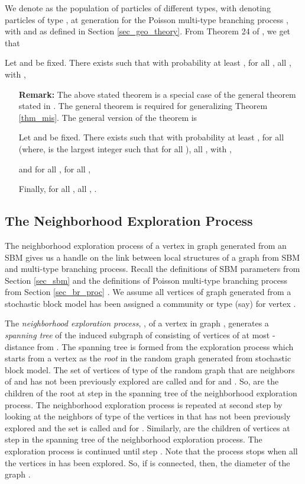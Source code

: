\documentclass[graybox]{svmult}
\begin{document}
We denote  as the population of particles of  different types, with  denoting particles of type , at generation  for the Poisson multi-type branching process , with  and  as defined in Section \ref{sec_geo_theory}. From Theorem 24 of \cite{bordenave2015non}, we get that 
\begin{theorem}
\label{thm_bp1}
Let  and  be fixed. There exists  such that with probability at least , for all , all , with , 

\end{theorem}
\begin{itemize}
\item[\textbf{Remark:}] \hspace{0.4in}The above stated theorem is a special case of the general theorem stated in \cite{bordenave2015non}. The general theorem is required for generalizing Theorem \ref{thm_mis}. The general version of the theorem is
\begin{theorem}
\label{thm_bp2}
Let  and  be fixed. There exists  such that with probability at least , for all  (where,  is the largest integer such that  for all ), all , with , 

and for all , for all , 

Finally, for all , all , .
\end{theorem}
\end{itemize}



\subsection{The Neighborhood Exploration Process}
\label{sec_nbhd_exp}
The neighborhood exploration process of a vertex  in graph  generated from an SBM gives us a handle on the link between local structures of a graph from SBM and multi-type branching process. Recall the definitions of SBM parameters from Section \ref{sec_sbm} and the definitions of Poisson multi-type branching process from Section \ref{sec_br_proc} . We assume all vertices of graph  generated from a stochastic block model has been assigned a community or type  (say) for vertex . 


The \textit{neighborhood exploration process}, , of a vertex  in graph , generates a \emph{spanning tree} of the induced subgraph of  consisting of vertices of at most -distance from . 
The spanning tree is formed from the exploration process which starts from a vertex  as the \emph{root} in the random graph  generated from stochastic block model. The set of vertices of type  of the random graph   that are neighbors of  and has not been previously explored are called  and  for  and . So,  are the children of the root  at step  in the spanning tree of the neighborhood exploration process. The neighborhood exploration process is repeated at second step by looking at the neighbors of type  of the vertices in  that has not been previously explored and the set is called  and  for . Similarly,  are the children of vertices  at step  in the spanning tree of the neighborhood exploration process. The exploration process is continued until step . Note that the process stops when all the vertices in  has been explored. So, if  is connected, then,  the diameter of the graph .
\end{document}
